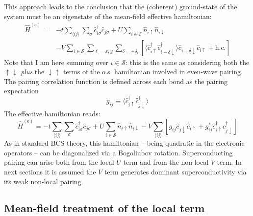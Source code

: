 This approach leads to the conclusion that the (coherent) ground-state of the system must be an eigenstate of the mean-field effective hamiltonian:
\begin{equation}\label{eq:extended-hubbard-model-effective-intermediate}
	\begin{aligned}
		\hat H^{(\mathrm{e})} =
		&-t \sum_{\langle ij \rangle} \sum_\sigma \hat c_{i\sigma}^\dagger \hat c_{j\sigma}
		+ U \sum_{i \in \mathcal{S}} \hat n_{i\uparrow} \hat n_{i\downarrow} \\
		&- V \sum_{i \in \mathcal{S}} \sum_{\ell = x,y} \sum_{\delta = \pm \delta_\ell} \left[
			\langle 
				\hat c_{i\uparrow}^\dagger \hat c_{i + \delta \downarrow}^\dagger
			\rangle
			\hat c_{i + \delta \downarrow} \hat c_{i\uparrow} 
			+ \mathrm{h}.\mathrm{c}.
		\right]
	\end{aligned}
\end{equation}
Note that I am here summing over $i\in \mathcal{S}$: this is the same as considering both the $\uparrow\downarrow$ \textit{plus} the $\downarrow\uparrow$ terms of the o.s. hamiltonian involved in even-wave pairing. The pairing correlation function is defined across each bond as the pairing expectation
\[
	g_{ij} \equiv \langle 
		\hat c_{i\uparrow}^\dagger \hat c_{j\downarrow}^\dagger
	\rangle
\]
The effective hamiltonian reads:
\begin{equation}\label{eq:extended-hubbard-model-effective-intermediate-2}
	\hat H^{(\mathrm{e})} =
	-t \sum_{\langle ij \rangle} \sum_\sigma \hat c_{i\sigma}^\dagger \hat c_{j\sigma}
	+ U \sum_{i \in \mathcal{S}} \hat n_{i\uparrow} \hat n_{i\downarrow}
	- V \sum_{\langle ij \rangle} \left[
		g_{ij} \hat c_{j\downarrow} \hat c_{i\uparrow} + g_{ij}^* \hat c_{i\uparrow}^\dagger \hat c_{j\downarrow}^\dagger
	\right]
\end{equation}
As in standard $\mathrm{BCS}$ theory, this hamiltonian -- being quadratic in the electronic operators -- can be diagonalized via a Bogoliubov rotation. Superconducting pairing can arise both from the local $U$ term and from the non-local $V$ term. In next sections it is assumed the $V$ term generates dominant superconductivity via its weak non-local pairing.

\subsection{Mean-field treatment of the local term}

